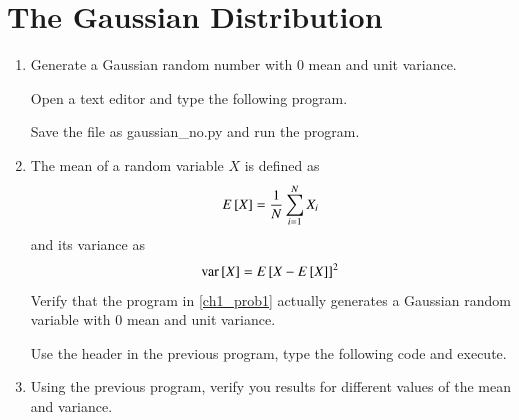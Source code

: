 \documentclass[journal,12pt,twocolumn]{IEEEtran}
\renewcommand\thesection{\arabic{section}}
\begin{document}
\section{The Gaussian Distribution}
\begin{enumerate}[label=\thesection.\arabic*
,ref=\thesection.\theenumi]

\item
\label{ch1_prob1}
Generate a Gaussian random number with 0 mean and unit variance.

%
\solution Open a text editor and type the following program.


Save the file as gaussian\_no.py and run the program.
%
\item
The mean of a random variable $X$ is defined as
%
\begin{equation}
E{}\left[X\right] = \frac{1}{N}\sum_{i=1}^{N}X_i
\end{equation}
%
and its variance as
%
\begin{equation}
\text{var}{}\left[X\right] = E{}\left[X- E{}\left[X\right]\right]^2 
\end{equation}
%
Verify that the program in \ref{ch1_prob1} actually generates a Gaussian random variable with 0 mean and unit variance.

\solution  Use the header in the previous program, type the following code and execute.

%
%
\item
Using the previous program, verify you results for different values of the mean and variance.

\end{enumerate}
\end{document}
